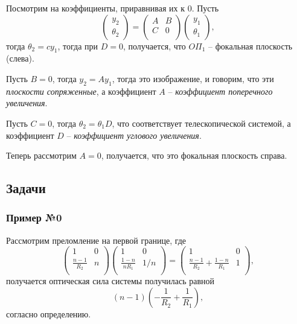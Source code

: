 Посмотрим на коэффициенты, приравнивая их к 0. Пусть 
\begin{equation*}
    \begin{pmatrix}
        y_2 \\ \theta_2
    \end{pmatrix} = 
    \begin{pmatrix}
        A & B \\
        C & 0 \\
    \end{pmatrix}
    \begin{pmatrix}
        y_1 \\ \theta_1
    \end{pmatrix},
\end{equation*}
тогда $\theta_2 = c y_1$, тогда при $D=0$,  получается, что $O\Pi_1$ -- фокальная плоскость (слева).

Пусть $B=0$, тогда $y_2 = A y_1$, тогда это изображение, и говорим, что эти \textit{плоскости сопряженные}, а коэффициент $A$ -- \textit{коэффициент поперечного увеличения}. 

Пусть $C=0$, тогда $\theta_2 = \theta_1 D$, что соответствует телескопической системой, а коэффициент $D$ -- \textit{коэффициент углового увеличения}.

Теперь рассмотрим $A = 0$, получается, что это фокальная плоскость справа. 



\subsection*{Задачи}

\subsubsection*{Пример №0}

Рассмотрим преломление на первой границе, где
\begin{equation*}
    \begin{pmatrix}
        1 & 0 \\
        \frac{n-1}{R_2} & n \\
    \end{pmatrix}
    \begin{pmatrix}
        1 & 0 \\
        \frac{1-n}{n R_1} & 1/n \\
    \end{pmatrix} = 
    \begin{pmatrix}
        1 & 0 \\
        \frac{n-1}{R_2}+\frac{1-n}{R_1} & 1 \\
    \end{pmatrix},
\end{equation*}
получается оптическая сила системы получилась равной
\begin{equation*}
    (n-1) \left(
        -\frac{1}{R_2} + \frac{1}{R_1}
    \right),
\end{equation*}
согласно определению.

